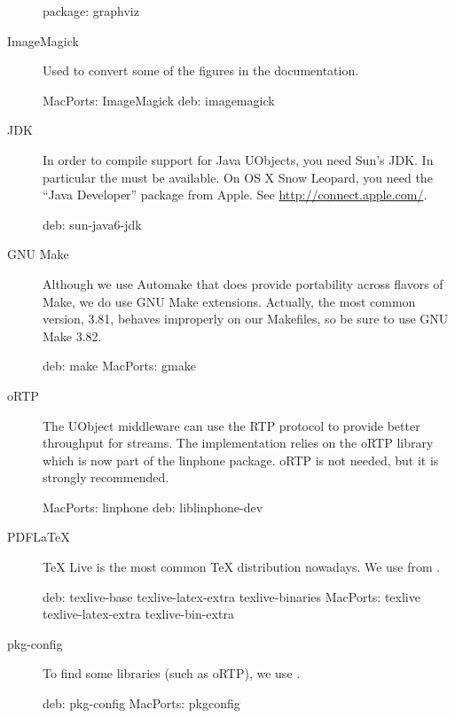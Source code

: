 \begin{description}
\begin{package}
package: graphviz
\end{package}

\item[ImageMagick] Used to convert some of the figures in the
  documentation.
\begin{package}
MacPorts: ImageMagick
deb: imagemagick
\end{package}

\item[JDK] In order to compile support for Java UObjects, you need Sun's
  JDK.  In particular the  must be available.  On OS X Snow
  Leopard, you need the ``Java Developer'' package from Apple.  See
  \url{http://connect.apple.com/}.
\begin{package}
deb: sun-java6-jdk
\end{package}

\item[GNU Make] Although we use Automake that does provide portability
  across flavors of Make, we do use GNU Make extensions.  Actually, the most
  common version, 3.81, behaves improperly on our Makefiles, so be sure to
  use GNU Make 3.82.
\begin{package}
deb: make
MacPorts: gmake
\end{package}

\item[oRTP] The UObject middleware can use the RTP protocol to provide
  better throughput for streams.  The implementation relies on the oRTP
  library which is now part of the linphone package.  oRTP is not needed,
  but it is strongly recommended.
\begin{package}
MacPorts: linphone
deb: liblinphone-dev
\end{package}

\item[PDFLaTeX] TeX Live is the most common \TeX{} distribution nowadays.
  We use  from .
\begin{package}
deb: texlive-base texlive-latex-extra texlive-binaries
MacPorts: texlive texlive-latex-extra texlive-bin-extra
\end{package}

\item[pkg-config] To find some libraries (such as oRTP), we use
  .
\begin{package}
deb: pkg-config
MacPorts: pkgconfig
\end{package}


\end{description}
